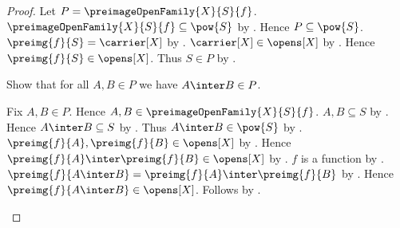 \begin{proof}
    Let $P=\preimageOpenFamily{X}{S}{f}$.
    $\preimageOpenFamily{X}{S}{f}\subseteq\pow{S}$ by
        .
    Hence $P\subseteq\pow{S}$.
    $\preimg{f}{S}=\carrier[X]$ by
        .
    $\carrier[X]\in\opens[X]$ by .
    Hence $\preimg{f}{S}\in\opens[X]$.
    Thus $S\in P$ by
        .

    Show that for all $A,B\in P$ we have $A\inter B\in P$.
    \begin{subproof}
        Fix $A,B\in P$.
        Hence $A,B\in\preimageOpenFamily{X}{S}{f}$.
        $A,B\subseteq S$ by
            .
        Hence $A\inter B\subseteq S$ by .
        Thus $A\inter B\in\pow{S}$ by .
        $\preimg{f}{A},\preimg{f}{B}\in\opens[X]$ by
            .
        Hence $\preimg{f}{A}\inter\preimg{f}{B}\in\opens[X]$ by
            .
        $f$ is a function by .
        $\preimg{f}{A\inter B}
            =\preimg{f}{A}\inter\preimg{f}{B}$ by
            .
        Hence $\preimg{f}{A\inter B}\in\opens[X]$.
        Follows by .
    \end{subproof}


\end{proof}
